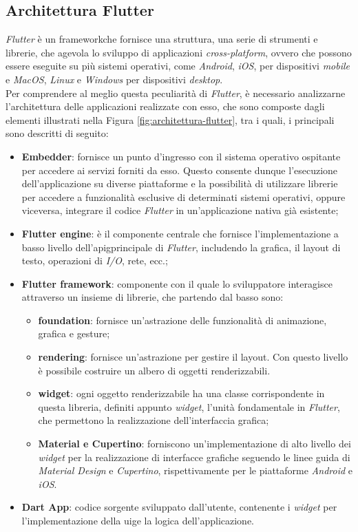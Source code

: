 \subsection{Architettura Flutter}
\label{subsec:architettura-flutter}

\emph{Flutter} è un \gls{framework}\glsoccur che fornisce una struttura, una serie di strumenti e librerie, che agevola lo sviluppo di applicazioni \emph{cross-platform}, ovvero che possono essere eseguite su più sistemi operativi, come \emph{Android}, \emph{iOS}, per dispositivi \emph{mobile} e \emph{MacOS}, \emph{Linux} e \emph{Windows} per dispositivi \emph{desktop}.\\
Per comprendere al meglio questa peculiarità di \emph{Flutter}, è necessario analizzarne l'architettura \cite{site:flutter-architecture} delle applicazioni realizzate con esso, che sono composte dagli elementi illustrati nella Figura \ref{fig:architettura-flutter}, tra i quali, i principali sono descritti di seguito:
\begin{itemize}
    \item \textbf{Embedder}: fornisce un punto d'ingresso con il sistema operativo ospitante per accedere ai servizi forniti da esso. Questo consente dunque l'esecuzione dell'applicazione su diverse piattaforme e la possibilità di utilizzare librerie per accedere a funzionalità esclusive di determinati sistemi operativi, oppure viceversa, integrare il codice \emph{Flutter} in un'applicazione nativa già esistente;
    \item \textbf{Flutter engine}: è il componente centrale che fornisce l'implementazione a basso livello dell'\gls{apig}\glsoccur principale di \emph{Flutter}, includendo la grafica, il layout di testo, operazioni di \emph{I/O}, rete, ecc.;
    \item \textbf{Flutter framework}: componente con il quale lo sviluppatore interagisce attraverso un insieme di librerie, che partendo dal basso sono:
    \begin{itemize}
        \item \textbf{foundation}: fornisce un'astrazione delle funzionalità di animazione, grafica e \gls{gesture}\glsoccur;
        \item \textbf{rendering}: fornisce un'astrazione per gestire il layout. Con questo livello è possibile costruire un albero di oggetti renderizzabili.
        \item \textbf{widget}: ogni oggetto renderizzabile ha una classe corrispondente in questa libreria, definiti appunto \emph{widget}, l'unità fondamentale in \emph{Flutter}, che permettono la realizzazione dell'interfaccia grafica;
        \item \textbf{Material e Cupertino}: forniscono un'implementazione di alto livello dei \emph{widget} per la realizzazione di interfacce grafiche seguendo le linee guida di \emph{Material Design} e \emph{Cupertino}, rispettivamente per le piattaforme \emph{Android} e \emph{iOS}.
    \end{itemize}
    \item \textbf{Dart App}: codice sorgente sviluppato dall'utente, contenente i \emph{widget} per l'implementazione della \gls{uig}\glsoccur e la logica dell'applicazione.
\end{itemize}

